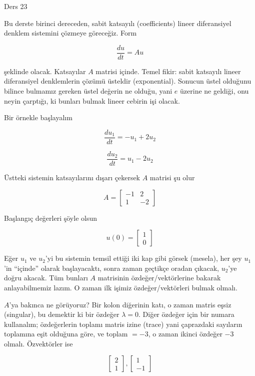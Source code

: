 \documentclass[12pt,fleqn]{article}\usepackage{../../common}
\begin{document}
Ders 23

Bu derste birinci dereceden, sabit katsayılı (coefficients) lineer
diferansiyel denklem sistemini çözmeye göreceğiz. Form

$$ \frac{du}{dt} = A u $$

şeklinde olacak. Katsayılar $A$ matrisi içinde. Temel fikir: sabit katsayılı
lineer diferansiyel denklemlerin çözümü üsteldir (exponential). Sonucun
üstel olduğunu bilince bulmamız gereken üstel değerin ne olduğu, yani $e$
üzerine ne geldiği, onu neyin çarptığı, ki bunları bulmak lineer cebirin
işi olacak.

Bir örnekle başlayalım

$$ \frac{du_1}{dt} = -u_1 + 2u_2 $$

$$ \frac{du_2}{dt} = u_1 - 2u_2 $$

Üstteki sistemin katsayılarını dışarı çekersek $A$ matrisi şu olur

$$ A = 
\left[\begin{array}{cc}
-1 & 2 \\
1 & -2
\end{array}\right]
 $$

Başlangıç değerleri şöyle olsun

$$ u(0) = 
\left[\begin{array}{c}
1 \\
0
\end{array}\right]
 $$

Eğer $u_1$ ve $u_2$'yi bu sistemin temsil ettiği iki kap gibi görsek
(mesela), her şey $u_1$'in ``içinde'' olarak başlayacaktı, sonra zaman
geçtikçe oradan çıkacak, $u_2$'ye doğru akacak. Tüm bunları $A$ matrisinin
özdeğer/vektörlerine bakarak anlayabilmemiz lazım. O zaman ilk işimiz
özdeğer/vektörleri bulmak olmalı. 

$A$'ya bakınca ne görüyoruz? Bir kolon diğerinin katı, o zaman matris
eşsiz (singular), bu demektir ki bir özdeğer $\lambda = 0$. Diğer
özdeğer için bir numara kullanalım; özdeğerlerin toplamı matris izine
(trace) yani çaprazdaki sayıların toplamına eşit olduğuna göre, ve toplam
$=-3$, o zaman ikinci özdeğer $-3$ olmalı. Özvektörler ise

$$ 
\left[\begin{array}{c}
2 \\ 1
\end{array}\right] 
,
\left[\begin{array}{c}
1 \\ -1
\end{array}\right]
 $$
\end{document}
